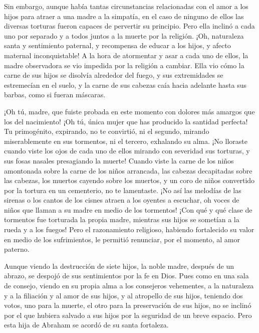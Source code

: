  Sin embargo, aunque había tantas circunstancias
relacionadas con el amor a los hijos para atraer a una madre a la
simpatía, en el caso de ninguno de ellos las diversas torturas fueron
capaces de pervertir su principio.  Pero ella inclinó a
cada uno por separado y a todos juntos a la muerte por la religión.
 ¡Oh, naturaleza santa y sentimiento paternal, y
recompensa de educar a los hijos, y afecto maternal inconquistable!
 A la hora de atormentar y asar a cada uno de ellos, la
madre observadora se vio impedida por la religión a cambiar.
 Ella vio cómo la carne de sus hijos se disolvía
alrededor del fuego, y sus extremidades se estremecían en el suelo, y la
carne de sus cabezas caía hacia adelante hasta sus barbas, como si
fueran máscaras.

 ¡Oh tú, madre, que fuiste probada en este momento con
dolores más amargos que los del nacimiento!  ¡Oh tú,
única mujer que has producido la santidad perfecta!  Tu
primogénito, expirando, no te convirtió, ni el segundo, mirando
miserablemente en sus tormentos, ni el tercero, exhalando su alma.
 ¡No lloraste cuando viste los ojos de cada uno de ellos
mirando con severidad sus torturas, y sus fosas nasales presagiando la
muerte!  Cuando viste la carne de los niños amontonada
sobre la carne de los niños arrancada, las cabezas decapitadas sobre las
cabezas, los muertos cayendo sobre los muertos, y un coro de niños
convertido por la tortura en un cementerio, no te lamentaste.
 ¡No así las melodías de las sirenas o los cantos de los
cisnes atraen a los oyentes a escuchar, oh voces de niños que llaman a
su madre en medio de los tormentos!  ¡Con qué y qué clase
de tormentos fue torturada la propia madre, mientras sus hijos se
sometían a la rueda y a los fuegos!  Pero el razonamiento
religioso, habiendo fortalecido su valor en medio de los sufrimientos,
le permitió renunciar, por el momento, al amor paterno.

 Aunque viendo la destrucción de siete hijos, la noble
madre, después de un abrazo, se despojó de sus sentimientos por la fe en
Dios.  Pues como en una sala de consejo, viendo en su
propia alma a los consejeros vehementes, a la naturaleza y a la
filiación y al amor de sus hijos, y al atropello de sus hijos,
 teniendo dos votos, uno para la muerte, el otro para la
preservación de sus hijos,  no se inclinó por el que
hubiera salvado a sus hijos por la seguridad de un breve espacio.
 Pero esta hija de Abraham se acordó de su santa
fortaleza.

